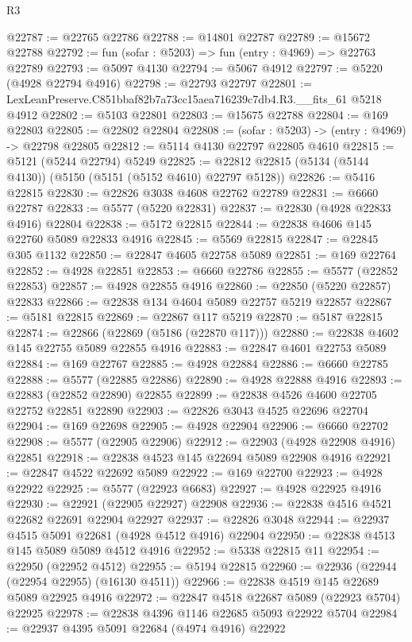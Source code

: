 \begin{lexlean}{R3}
\begin{coremodule}
@22787 := @22765 @22786
@22788 := @14801 @22787
@22789 := @15672 @22788
@22792 := fun (sofar : @5203) => fun (entry : @4969) => @22763 @22789
@22793 := @5097 @4130
@22794 := @5067 @4912
@22797 := @5220 (@4928 @22794 @4916)
@22798 := @22793 @22797
@22801 := LexLeanPreserve.C851bbaf82b7a73cc15aea716239c7db4.R3.__fits_61 @5218 @4912
@22802 := @5103 @22801
@22803 := @15675 @22788
@22804 := @169 @22803
@22805 := @22802 @22804
@22808 := (sofar : @5203) -> (entry : @4969) -> @22798 @22805
@22812 := @5114 @4130 @22797 @22805 @4610
@22815 := @5121 (@5244 @22794) @5249
@22825 := @22812 @22815 (@5134 (@5144 @4130)) (@5150 (@5151 (@5152 @4610) @22797 @5128))
@22826 := @5416 @22815
@22830 := @22826 @3038 @4608 @22762 @22789
@22831 := @6660 @22787
@22833 := @5577 (@5220 @22831)
@22837 := @22830 (@4928 @22833 @4916) @22804
@22838 := @5172 @22815
@22844 := @22838 @4606 @145 @22760 @5089 @22833 @4916
@22845 := @5569 @22815
@22847 := @22845 @305 @1132
@22850 := @22847 @4605 @22758 @5089
@22851 := @169 @22764
@22852 := @4928 @22851
@22853 := @6660 @22786
@22855 := @5577 (@22852 @22853)
@22857 := @4928 @22855 @4916
@22860 := @22850 (@5220 @22857) @22833
@22866 := @22838 @134 @4604 @5089 @22757 @5219 @22857
@22867 := @5181 @22815
@22869 := @22867 @117 @5219
@22870 := @5187 @22815
@22874 := @22866 (@22869 (@5186 (@22870 @117)))
@22880 := @22838 @4602 @145 @22755 @5089 @22855 @4916
@22883 := @22847 @4601 @22753 @5089
@22884 := @169 @22767
@22885 := @4928 @22884
@22886 := @6660 @22785
@22888 := @5577 (@22885 @22886)
@22890 := @4928 @22888 @4916
@22893 := @22883 (@22852 @22890) @22855
@22899 := @22838 @4526 @4600 @22705 @22752 @22851 @22890
@22903 := @22826 @3043 @4525 @22696 @22704
@22904 := @169 @22698
@22905 := @4928 @22904
@22906 := @6660 @22702
@22908 := @5577 (@22905 @22906)
@22912 := @22903 (@4928 @22908 @4916) @22851
@22918 := @22838 @4523 @145 @22694 @5089 @22908 @4916
@22921 := @22847 @4522 @22692 @5089
@22922 := @169 @22700
@22923 := @4928 @22922
@22925 := @5577 (@22923 @6683)
@22927 := @4928 @22925 @4916
@22930 := @22921 (@22905 @22927) @22908
@22936 := @22838 @4516 @4521 @22682 @22691 @22904 @22927
@22937 := @22826 @3048
@22944 := @22937 @4515 @5091 @22681 (@4928 @4512 @4916) @22904
@22950 := @22838 @4513 @145 @5089 @5089 @4512 @4916
@22952 := @5338 @22815 @11
@22954 := @22950 (@22952 @4512)
@22955 := @5194 @22815
@22960 := @22936 (@22944 (@22954 @22955) (@16130 @4511))
@22966 := @22838 @4519 @145 @22689 @5089 @22925 @4916
@22972 := @22847 @4518 @22687 @5089 (@22923 @5704) @22925
@22978 := @22838 @4396 @1146 @22685 @5093 @22922 @5704
@22984 := @22937 @4395 @5091 @22684 (@4974 @4916) @22922

\end{coremodule}
\end{lexlean}
